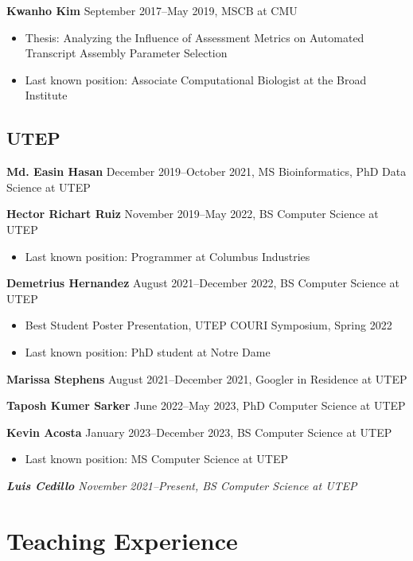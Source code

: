 \documentclass[10pt,letterpaper]{article}
\begin{document}
\textbf{Kwanho Kim} September 2017--May 2019, MSCB at CMU
\begin{itemize}
\item Thesis: Analyzing the Influence of Assessment Metrics on Automated Transcript Assembly Parameter Selection
\item Last known position: Associate Computational Biologist at the Broad Institute 
\end{itemize}

\subsection*{UTEP}
\hspace{1.5em}\textbf{Md. Easin Hasan} December 2019--October 2021, MS Bioinformatics, PhD Data Science at UTEP

\textbf{Hector Richart Ruiz} November 2019--May 2022, BS Computer Science at UTEP
\begin{itemize}
\item Last known position: Programmer at Columbus Industries
\end{itemize}

\textbf{Demetrius Hernandez} August 2021--December 2022, BS Computer Science at UTEP
\begin{itemize}
\item Best Student Poster Presentation, UTEP COURI Symposium, Spring 2022 
\item Last known position: PhD student at Notre Dame
\end{itemize}

\textbf{Marissa Stephens} August 2021--December 2021, Googler in Residence at UTEP

\textbf{Taposh Kumer Sarker} June 2022--May 2023, PhD Computer Science at UTEP

\textbf{Kevin Acosta} January 2023--December 2023, BS Computer Science at UTEP
\begin{itemize}
\item Last known position: MS Computer Science at UTEP
\end{itemize}

\textit{\textbf{Luis Cedillo} November 2021--Present, BS Computer Science at UTEP}




\section*{Teaching Experience}
\end{document}
